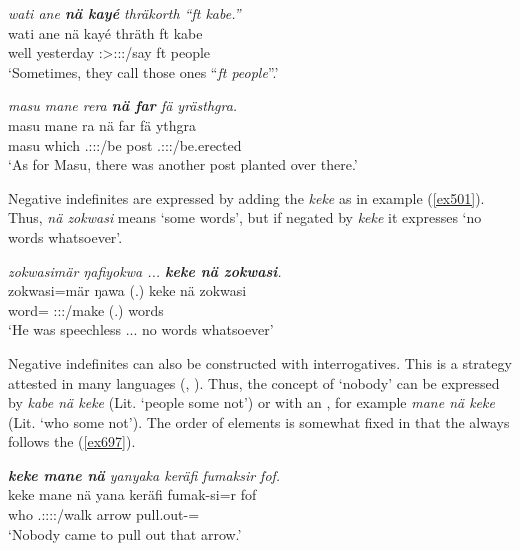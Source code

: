 \begin{exe}
	\ex \emph{wati ane \textbf{nä kayé} thräkorth ``ft kabe.''}\\
	\gll wati ane nä kayé thräth ft kabe\\
	well \Dem{} \Indf{} yesterday \Stpl:\Sbj>\Stpl:\Obj:\Irr:\Pfv/say ft people\\
	\trans `Sometimes, they call those ones ``\emph{ft people}''.'
	\label{ex720}
\end{exe}
\begin{exe}
	\ex \emph{masu mane rera \textbf{nä far} fä yrästhgra.}\\
	\gll masu mane ra nä far fä ythgra\\
	masu which \Tsg.\F:\Sbj:\Pst:\Ipfv/be \Indf{} post \Dist{} \Tsg.\Masc:\Sbj:\Pst:\Stat/be.erected\\
	\trans `As for Masu, there was another post planted over there.'\\
	\label{ex500}
\end{exe}

Negative indefinites are expressed by adding the  \emph{keke} as in example (\ref{ex501}). Thus, \emph{nä zokwasi} means `some words', but if negated by \emph{keke} it expresses `no words whatsoever'.

\begin{exe}
	\ex \emph{zokwasimär ŋafiyokwa ... \textbf{keke nä zokwasi}.}\\
	\gll zokwasi=mär ŋawa (.) keke nä zokwasi\\
	word=\Priv{} \Stsg:\Sbj:\Pst:\Ipfv/make (.) \Neg{} \Indf{} words\\
	\trans `He was speechless ... no words whatsoever'
	\label{ex501}
\end{exe}

Negative indefinites can also be constructed with interrogatives. This is a strategy attested in many languages (\citealt{Haspelmath:1997indefinite}, \citealt{wals-115}). Thus, the concept of `nobody' can be expressed by \emph{kabe nä keke} (Lit. `people some not') or with an , for example \emph{mane nä keke} (Lit. `who some not'). The order of elements is somewhat fixed in that the  always follows the  (\ref{ex697}).

\begin{exe}
	\ex \emph{\textbf{keke mane nä} yanyaka keräfi fumaksir fof.}\\
	\gll keke mane nä yana keräfi fumak-si=r fof\\
	\Neg{} who \Indf{} \Tsg.\Masc:\Sbj:\Pst:\Ipfv:\Venit/walk arrow pull.out-\Nmlz=\Purp{} \Emph\\
	\trans `Nobody came to pull out that arrow.'
	\label{ex697}
\end{exe}

